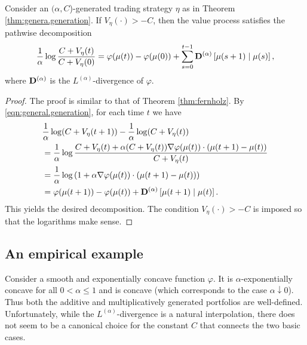 \documentclass[graybox]{svmult}
\begin{document}
\begin{theorem} \label{thm:general.decomp}
Consider an $(\alpha, C$)-generated trading strategy $\eta$ as in Theorem \ref{thm:genera.generation}. If $V_{\eta}(\cdot) > -C$, then the value process satisfies the pathwise decomposition
\begin{equation} \label{eqn:new.decomp}
\frac{1}{\alpha} \log \frac{C + V_{\eta}(t)}{C + V_{\eta}(0)} = \varphi(\mu(t)) - \varphi(\mu(0)) + \sum_{s = 0}^{t - 1} {\bf D}^{(\alpha)}  \left[ \mu(s + 1) \mid \mu(s) \right],
\end{equation}
where ${\bf D}^{(\alpha)}$ is the $L^{(\alpha)}$-divergence of $\varphi$.
\end{theorem}
\begin{proof}
The proof is similar to that of Theorem \ref{thm:fernholz}. By \eqref{eqn:general.generation}, for each time $t$ we have
\begin{equation} \label{eqn:general.decomp.proof}
\begin{split}
& \frac{1}{\alpha} \log (C + V_{\eta}(t + 1)) - \frac{1}{\alpha} \log (C + V_{\eta}(t))\\
 &= \frac{1}{\alpha} \log \frac{C + V_{\eta}(t) + \alpha (C + V_{\eta}(t)) \nabla \varphi(\mu(t)) \cdot (\mu(t + 1) - \mu(t))}{C + V_{\eta}(t)} \\
 &= \frac{1}{\alpha} \log \left(1 + \alpha \nabla \varphi(\mu(t)) \cdot (\mu(t + 1) - \mu(t))\right) \\
 &= \varphi(\mu(t + 1)) - \varphi(\mu(t)) + {\bf D}^{(\alpha)} \left[\mu(t + 1) \mid \mu(t)\right].
\end{split}
\end{equation}
This yields the desired decomposition. The condition $V_{\eta}(\cdot) > -C$ is imposed so that the logarithms make sense.
\end{proof}

\subsection{An empirical example}

Consider a smooth and exponentially concave function $\varphi$. It is $\alpha$-exponentially concave for all $0 < \alpha \leq 1$ and is concave (which corresponds to the case $\alpha \downarrow 0$). Thus both the additive and multiplicatively generated portfolios are well-defined. Unfortunately, while the $L^{(\alpha)}$-divergence is a natural interpolation,  there does not seem to be a canonical choice for the constant $C$ that connects the two basic cases.
\end{document}
